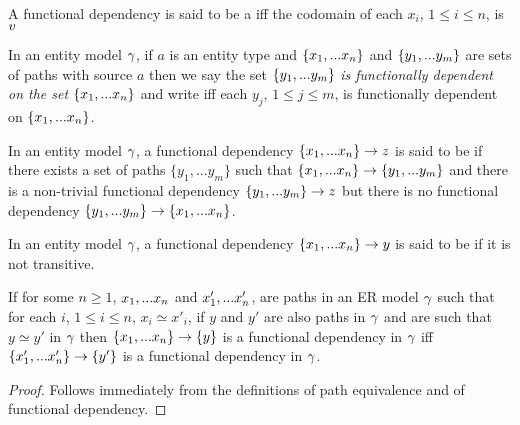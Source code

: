 \begin{definition}
A functional dependency  is said to be a  iff
 the codomain of each $x_i$, $1 \leq i \leq n$, is $v$ 
\end{definition}

\begin{definition}
In an entity model $\gamma$, if
$a$ is an entity type and $\left\{x_1,...x_n\right\}$ and $\left\{y_1,...y_m\right\}$ are sets of paths with source $a$
then we say the set $\left\{y_1,...y_m\right\}$ \textit{is functionally dependent on the set} $\left\{x_1,...x_n\right\}$ and write
iff  each $y_j$, $1 \leq j \leq m$, is functionally dependent on $\left\{x_1,...x_n\right\}$.
\end{definition}
\begin{definition} %
In an entity model $\gamma$, a functional dependency $\left\{x_1,...x_n\right\} \rightarrow z$
is said to be  if there exists a set of paths $\{y_1,...y_{m}\}$ such that
$\left\{x_1,...x_n\right\} \rightarrow \left\{y_1,...y_{m}\right\}$ and there is a non-trivial functional
dependency $\left\{y_1,...y_{m}\right\} \rightarrow z$ but there is no functional dependency 
$\{y_1,...y_{m}\} \rightarrow \{x_1,...x_n\}$.
\end{definition}
\begin{definition} %
In an entity model $\gamma$, a functional dependency $\left\{x_1,...x_n\right\} \rightarrow y$
is said to be  if it is not transitive.
\end{definition} 

\begin{lemma}
If for some $n \geq 1$, $x_1,...x_n$ and $x'_1,...x'_n$,  are paths in an ER model $\gamma$
such that for each $i$, $1 \leq i \leq n$, $x_i \simeq x'_i$,
if $y$ and $y'$ are also paths in $\gamma$ and are 
such that $y \simeq y'$ in $\gamma$ then $\left\{x_1,...x_n\right\} \rightarrow \left\{y\right\}$ is a functional dependency in $\gamma$ iff 
$\left\{x'_1,...x'_n\right\} \rightarrow \left\{y'\right\}$ is a functional dependency in $\gamma$.
\end{lemma}
\begin{proof}
Follows immediately from the definitions of path equivalence and of functional dependency.
\end{proof}

